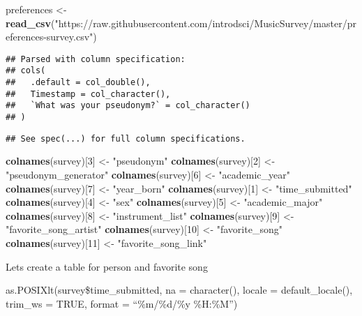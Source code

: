\documentclass[]{article}
\newenvironment{Shaded}{\begin{snugshade}}{\end{snugshade}}
\newcommand{\DecValTok}[1]{\textcolor[rgb]{0.00,0.00,0.81}{#1}}
\newcommand{\KeywordTok}[1]{\textcolor[rgb]{0.13,0.29,0.53}{\textbf{#1}}}
\newcommand{\NormalTok}[1]{#1}
\newcommand{\StringTok}[1]{\textcolor[rgb]{0.31,0.60,0.02}{#1}}
\begin{document}
\begin{Shaded}
\begin{Highlighting}[]
\NormalTok{preferences <-}\StringTok{ }\KeywordTok{read_csv}\NormalTok{(}\StringTok{"https://raw.githubusercontent.com/introdsci/MusicSurvey/master/preferences-survey.csv"}\NormalTok{)}
\end{Highlighting}
\end{Shaded}

\begin{verbatim}
## Parsed with column specification:
## cols(
##   .default = col_double(),
##   Timestamp = col_character(),
##   `What was your pseudonym?` = col_character()
## )
\end{verbatim}

\begin{verbatim}
## See spec(...) for full column specifications.
\end{verbatim}

\begin{Shaded}
\begin{Highlighting}[]
\KeywordTok{colnames}\NormalTok{(survey)[}\DecValTok{3}\NormalTok{] <-}\StringTok{ "pseudonym"}
\KeywordTok{colnames}\NormalTok{(survey)[}\DecValTok{2}\NormalTok{] <-}\StringTok{ "pseudonym_generator"}
\KeywordTok{colnames}\NormalTok{(survey)[}\DecValTok{6}\NormalTok{] <-}\StringTok{ "academic_year"}
\KeywordTok{colnames}\NormalTok{(survey)[}\DecValTok{7}\NormalTok{] <-}\StringTok{ "year_born"}
\KeywordTok{colnames}\NormalTok{(survey)[}\DecValTok{1}\NormalTok{] <-}\StringTok{ "time_submitted"}
\KeywordTok{colnames}\NormalTok{(survey)[}\DecValTok{4}\NormalTok{] <-}\StringTok{ "sex"}
\KeywordTok{colnames}\NormalTok{(survey)[}\DecValTok{5}\NormalTok{] <-}\StringTok{ "academic_major"}
\KeywordTok{colnames}\NormalTok{(survey)[}\DecValTok{8}\NormalTok{] <-}\StringTok{ "instrument_list"}
\KeywordTok{colnames}\NormalTok{(survey)[}\DecValTok{9}\NormalTok{] <-}\StringTok{ "favorite_song_artist"}
\KeywordTok{colnames}\NormalTok{(survey)[}\DecValTok{10}\NormalTok{] <-}\StringTok{ "favorite_song"}
\KeywordTok{colnames}\NormalTok{(survey)[}\DecValTok{11}\NormalTok{] <-}\StringTok{ "favorite_song_link"}
\end{Highlighting}
\end{Shaded}

Lets create a table for person and favorite song

as.POSIXlt(survey\$time\_submitted, na = character(), locale =
default\_locale(), trim\_ws = TRUE, format = ``\%m/\%d/\%y \%H:\%M'')
\end{document}
